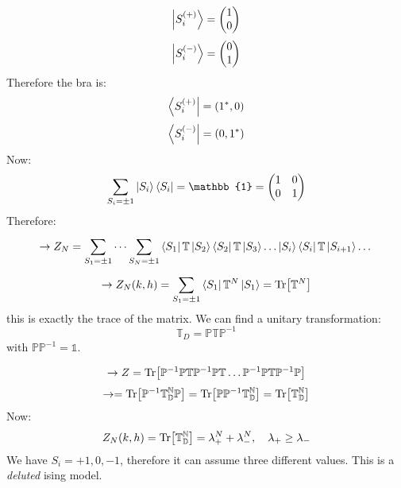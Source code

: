 \documentclass[../main/main.tex]{subfiles}
\begin{document}
\begin{equation}
  \ket{S_i^{(+)}} = \begin{pmatrix}
  1 \\
  0
  \end{pmatrix}
\end{equation}
\begin{equation}
  \ket{S_i^{(-)}} = \begin{pmatrix}
  0 \\
  1
  \end{pmatrix}
\end{equation}
Therefore the bra is:
\begin{equation}
  \bra{S_i^{(+)}} = (1^*,0)
\end{equation}
\begin{equation}
  \bra{S_i^{(-)}} = (0,1^*)
\end{equation}
Now:
\begin{equation}
  \sum_{S_i = \pm 1}^{}  \ket{S_i} \bra{S_i} = \mathbb{1} = \begin{pmatrix}
  1   & 0 \\
  0   & 1
  \end{pmatrix}
\end{equation}
Therefore:
\begin{equation}
  \rightarrow Z_N = \sum_{S_1 = \pm 1}^{} \dots \sum_{S_N = \pm 1}^{} \bra{S_1} \mathbb{T} \ket{S_2} \bra{S_2}  \mathbb{T} \ket{S_3} \dots \ket{S_i} \bra{S_i}  \mathbb{T} \ket{S_{i+1}} \dots
\end{equation}
\begin{equation}
  \rightarrow Z_N(k,h) = \sum_{S_1 = \pm 1}^{}  \bra{S_1}  \mathbb{T}^N \ket{S_1} = \Tr[\mathbb{T}^N]
\end{equation}
this is exactly the trace of the matrix.
We can find a unitary transformation:
\begin{equation}
   \mathbb{T}_D = \mathbb{P} \mathbb{T} \mathbb{P}^{-1}
\end{equation}
with \( \mathbb{P} \mathbb{P}^{-1} = \mathbb{1} \).

\begin{equation}
  \rightarrow Z = \Tr [ \mathbb{P}^{-1} \mathbb{P} \mathbb{T}  \mathbb{P}^{-1} \mathbb{P} \mathbb{T}  \dots \mathbb{P}^{-1} \mathbb{P} \mathbb{T} \mathbb{P}^{-1} \mathbb{P} ]
\end{equation}
\begin{equation}
  \rightarrow  = \Tr[ \mathbb{P}^{-1}  \mathbb{T_D^N} \mathbb{P}] = \Tr[ \mathbb{P} \mathbb{P}^{-1} \mathbb{T_D^N} ] = \Tr[\mathbb{T_D^N}]
\end{equation}
Now:
\begin{equation}
  Z_N (k,h) = \Tr[\mathbb{T_D^N}] = \lambda _+^N  + \lambda _-^N, \quad \lambda _+ \ge \lambda_-
\end{equation}
We have \( S_i = +1,0,-1 \), therefore it can assume three different values.
This is a \emph{deluted} ising model.
\end{document}
